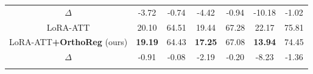 \begin{table}[t]
\begin{tabular}{ccccccc}
\rowcolor{rowblue}
\quad    $\Delta$ & {\color{darkblue}-3.72} & {\color{darkblue}-0.74} & {\color{darkblue}-4.42} & {\color{darkblue}-0.94} & {\color{darkblue}-10.18} & {\color{darkblue}-1.02}\\
\addlinespace[-2pt]
\midrule
LoRA-ATT & 20.10 & 64.51 & 19.44 & 67.28 & 22.17 & 75.81 \\
LoRA-ATT\textbf{+OrthoReg} (ours) & \textbf{19.19} & 64.43 & \textbf{17.25} & 67.08 & \textbf{13.94} & 74.45 \\
\rowcolor{rowblue}
\quad   $\Delta$ & {\color{darkblue}-0.91} & {\color{darkblue}-0.08} & {\color{darkblue}-2.19} & {\color{darkblue}-0.20} & {\color{darkblue}-8.23} & {\color{darkblue}-1.36}\\
\addlinespace[-2pt]
\bottomrule
\end{tabular}\label{tab:task_negation}
\vspace{-15pt}
\end{table}

